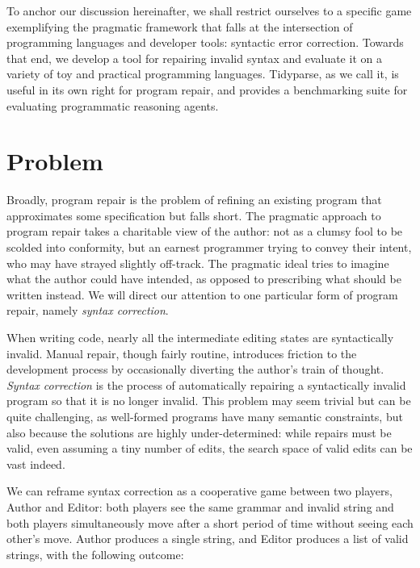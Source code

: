 \documentclass[sigplan,screen]{acmart}
\begin{document}
To anchor our discussion hereinafter, we shall restrict ourselves to a specific game exemplifying the pragmatic framework that falls at the intersection of programming languages and developer tools: syntactic error correction. Towards that end, we develop a tool for repairing invalid syntax and evaluate it on a variety of toy and practical programming languages. Tidyparse, as we call it, is useful in its own right for program repair, and provides a benchmarking suite for evaluating programmatic reasoning agents.

\section{Problem}


Broadly, program repair is the problem of refining an existing program that approximates some specification but falls short. The pragmatic approach to program repair takes a charitable view of the author: not as a clumsy fool to be scolded into conformity, but an earnest programmer trying to convey their intent, who may have strayed slightly off-track. The pragmatic ideal tries to imagine what the author could have intended, as opposed to prescribing what should be written instead. We will direct our attention to one particular form of program repair, namely \emph{syntax correction}.

When writing code, nearly all the intermediate editing states are syntactically invalid. Manual repair, though fairly routine, introduces friction to the development process by occasionally diverting the author's train of thought. \textit{Syntax correction} is the process of automatically repairing a syntactically invalid program so that it is no longer invalid. This problem may seem trivial but can be quite challenging, as well-formed programs have many semantic constraints, but also because the solutions are highly under-determined: while repairs must be valid, even assuming a tiny number of edits, the search space of valid edits can be vast indeed.

We can reframe syntax correction as a cooperative game between two players, Author and Editor: both players see the same grammar and invalid string and both players simultaneously move after a short period of time without seeing each other's move. Author produces a single string, and Editor produces a list of valid strings, with the following outcome:
\end{document}
